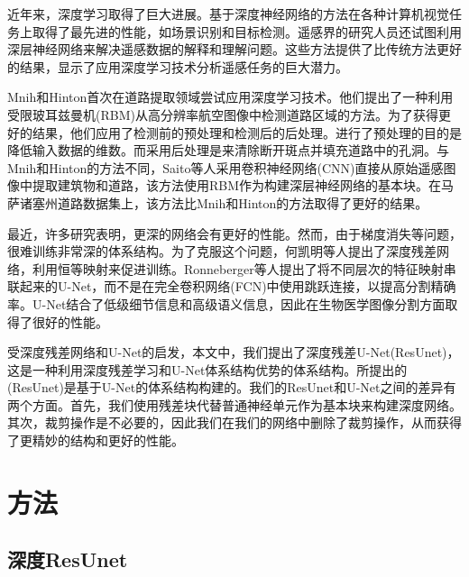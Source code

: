 \begin{translation}
近年来，深度学习取得了巨大进展。基于深度神经网络的方法在各种计算机视觉任务上取得了最先进的性能，如场景识别\cite{13}和目标检测\cite{14}。遥感界的研究人员还试图利用深层神经网络来解决遥感数据的解释和理解问题\cite{2,3,4,5}\cite{15,16,17,18}。这些方法提供了比传统方法更好的结果，显示了应用深度学习技术分析遥感任务的巨大潜力。

Mnih和Hinton首次在道路提取领域尝试应用深度学习技术\cite{2}。他们提出了一种利用受限玻耳兹曼机(RBM)从高分辨率航空图像中检测道路区域的方法。为了获得更好的结果，他们应用了检测前的预处理和检测后的后处理。进行了预处理的目的是降低输入数据的维数。而采用后处理是来清除断开斑点并填充道路中的孔洞。与Mnih和Hinton的方法\cite{2}不同，Saito等人\cite{5}采用卷积神经网络(CNN)直接从原始遥感图像中提取建筑物和道路，该方法使用RBM作为构建深层神经网络的基本块。在马萨诸塞州道路数据集上，该方法比Mnih和Hinton的方法\cite{2}取得了更好的结果。

最近，许多研究表明，更深的网络会有更好的性能\cite{19,20}。然而，由于梯度消失等问题，很难训练非常深的体系结构。为了克服这个问题，何凯明等人\cite{21}提出了深度残差网络，利用恒等映射来促进训练。Ronneberger等人\cite{24}提出了将不同层次的特征映射串联起来的U-Net，而不是在完全卷积网络(FCN)\cite{23}中使用跳跃连接，以提高分割精确率。U-Net结合了低级细节信息和高级语义信息，因此在生物医学图像分割方面取得了很好的性能\cite{24}。

受深度残差网络\cite{21}和U-Net\cite{24}的启发，本文中，我们提出了深度残差U-Net(ResUnet)，这是一种利用深度残差学习和U-Net体系结构优势的体系结构。所提出的(ResUnet)是基于U-Net的体系结构构建的。我们的ResUnet和U-Net之间的差异有两个方面。首先，我们使用残差块代替普通神经单元作为基本块来构建深度网络。其次，裁剪操作是不必要的，因此我们在我们的网络中删除了裁剪操作，从而获得了更精妙的结构和更好的性能。

\section{方法}
\subsection{深度ResUnet}

\end{translation}

